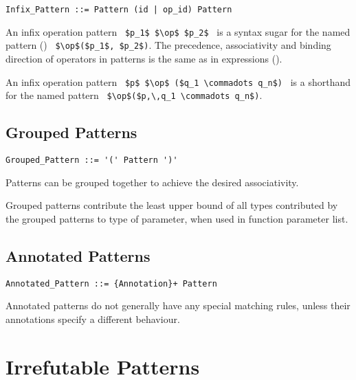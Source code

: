 \syntax\begin{lstlisting}
Infix_Pattern ::= Pattern (id | op_id) Pattern
\end{lstlisting}

An infix operation pattern ~\lstinline!$p_1$ $\op$ $p_2$!~ is a syntax sugar for the named pattern () ~\lstinline!$\op$($p_1$, $p_2$)!. The precedence, associativity and binding direction of operators in patterns is the same as in expressions ().

An infix operation pattern ~\lstinline!$p$ $\op$ ($q_1 \commadots q_n$)!~ is a shorthand for the named pattern ~\lstinline!$\op$($p,\,q_1 \commadots q_n$)!.





\subsection{Grouped Patterns}
\label{sec:grouped-patterns}

\syntax\begin{lstlisting}
Grouped_Pattern ::= '(' Pattern ')'
\end{lstlisting}

Patterns can be grouped together to achieve the desired associativity. 

Grouped patterns contribute the least upper bound of all types contributed by the grouped patterns to type of parameter, when used in function parameter list. 





\subsection{Annotated Patterns}
\label{sec:annotated-patterns}

\syntax\begin{lstlisting}
Annotated_Pattern ::= {Annotation}+ Pattern
\end{lstlisting}

Annotated patterns do not generally have any special matching rules, unless their annotations specify a different behaviour. 





\section{Irrefutable Patterns}
\label{sec:irrefutable-patterns}

